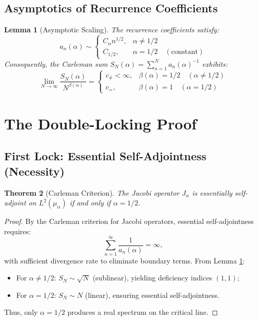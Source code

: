 \documentclass[12pt,a4paper]{article}
\theoremstyle{definition}
\theoremstyle{plain}
\newtheorem{theorem}{Theorem}[section]
\newtheorem{lemma}[theorem]{Lemma}
\theoremstyle{remark}
\begin{document}
\subsection{Asymptotics of Recurrence Coefficients}
\begin{lemma}[Asymptotic Scaling]\label{lem:scaling}
The recurrence coefficients satisfy:
\begin{equation}
a_n(\alpha) \sim 
\begin{cases}
C_\alpha n^{1/2}, & \alpha \neq 1/2 \\
C_{1/2}, & \alpha = 1/2 \quad (\text{constant})
\end{cases}
\end{equation}
Consequently, the Carleman sum $S_N(\alpha) = \sum_{n=1}^N a_n(\alpha)^{-1}$ exhibits:
\begin{equation}
\lim_{N\to\infty} \frac{S_N(\alpha)}{N^{\beta(\alpha)}} = 
\begin{cases}
c_{\neq} < \infty, & \beta(\alpha) = 1/2 \quad (\alpha \neq 1/2) \\
c_{=}, & \beta(\alpha) = 1 \quad (\alpha = 1/2)
\end{cases}
\end{equation}
\end{lemma}

\section{The Double-Locking Proof}

\subsection{First Lock: Essential Self-Adjointness (Necessity)}
\begin{theorem}[Carleman Criterion]\label{thm:carleman}
The Jacobi operator $J_\alpha$ is essentially self-adjoint on $L^2(\mu_\alpha)$ if and only if $\alpha = 1/2$.
\end{theorem}

\begin{proof}
By the Carleman criterion for Jacobi operators, essential self-adjointness requires:
\[
\sum_{n=1}^\infty \frac{1}{a_n(\alpha)} = \infty,
\]
with sufficient divergence rate to eliminate boundary terms. From Lemma \ref{lem:scaling}:
\begin{itemize}
    \item For $\alpha \neq 1/2$: $S_N \sim \sqrt{N}$ (sublinear), yielding deficiency indices $(1,1)$;
    \item For $\alpha = 1/2$: $S_N \sim N$ (linear), ensuring essential self-adjointness.
\end{itemize}
Thus, only $\alpha = 1/2$ produces a real spectrum on the critical line.
\end{proof}
\end{document}
